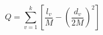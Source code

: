 \documentclass{article}
\begin{document}
	$$Q=\sum\limits_{v=1}^k[\frac{l_v}{M}-(\frac{d_v}{2M})^2]$$
\end{document}
